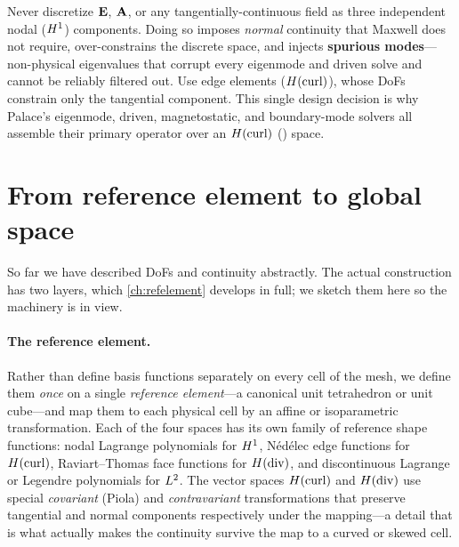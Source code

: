 \begin{pitfall}
Never discretize $\mathbf{E}$, $\mathbf{A}$, or any tangentially-continuous field as three
independent nodal ($H^1$) components. Doing so imposes \emph{normal} continuity that
Maxwell does not require, over-constrains the discrete space, and injects
\textbf{spurious modes}---non-physical eigenvalues that corrupt every eigenmode and
driven solve and cannot be reliably filtered out. Use edge elements ($H(\mathrm{curl})$), whose
DoFs constrain only the tangential component. This single design decision is why Palace's
eigenmode, driven, magnetostatic, and boundary-mode solvers all assemble their primary
operator over an $H(\mathrm{curl})$ () space.
\end{pitfall}

\section{From reference element to global space}

So far we have described DoFs and continuity abstractly. The actual construction has two
layers, which \cref{ch:refelement} develops in full; we sketch them here so the
machinery is in view.

\paragraph{The reference element.} Rather than define basis functions separately on every
cell of the mesh, we define them \emph{once} on a single \emph{reference element}---a
canonical unit tetrahedron or unit cube---and map them to each physical cell by an affine
or isoparametric transformation. Each of the four spaces has its own family of reference
shape functions: nodal Lagrange polynomials for $H^1$, N\'ed\'elec edge functions for
$H(\mathrm{curl})$, Raviart--Thomas face functions for $H(\mathrm{div})$, and discontinuous Lagrange or
Legendre polynomials for $L^2$. The vector spaces $H(\mathrm{curl})$ and $H(\mathrm{div})$ use special
\emph{covariant} (Piola) and \emph{contravariant} transformations that preserve tangential
and normal components respectively under the mapping---a detail that is what actually makes
the continuity survive the map to a curved or skewed cell.

